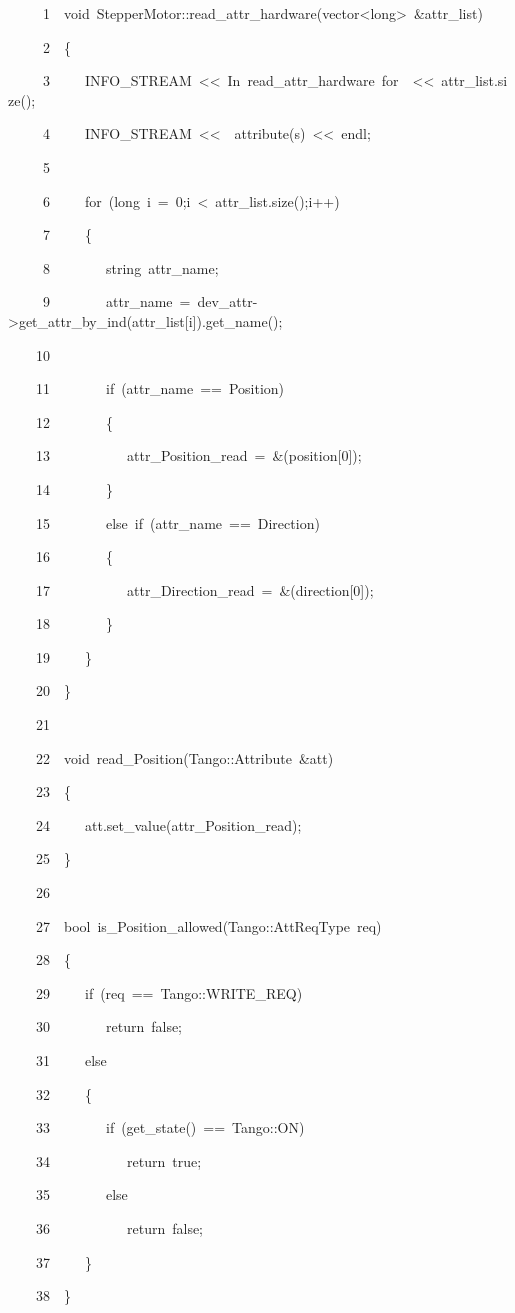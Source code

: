 
\begin{lyxcode}
~~~~~1~~void~StepperMotor::read\_attr\_hardware(vector<long>~\&attr\_list)

~~~~~2~~\{

~~~~~3~~~~~INFO\_STREAM~<\textcompwordmark{}<~\textquotedbl{}In~read\_attr\_hardware~for~\textquotedbl{}~<\textcompwordmark{}<~attr\_list.size();

~~~~~4~~~~~INFO\_STREAM~<\textcompwordmark{}<~\textquotedbl{}~attribute(s)\textquotedbl{}~<\textcompwordmark{}<~endl;

~~~~~5~~

~~~~~6~~~~~for~(long~i~=~0;i~<~attr\_list.size();i++)

~~~~~7~~~~~\{

~~~~~8~~~~~~~~string~attr\_name;

~~~~~9~~~~~~~~attr\_name~=~dev\_attr->get\_attr\_by\_ind(attr\_list{[}i{]}).get\_name();

~~~~10~~

~~~~11~~~~~~~~if~(attr\_name~==~\textquotedbl{}Position\textquotedbl{})

~~~~12~~~~~~~~\{

~~~~13~~~~~~~~~~~attr\_Position\_read~=~\&(position{[}0{]});

~~~~14~~~~~~~~\}

~~~~15~~~~~~~~else~if~(attr\_name~==~\textquotedbl{}Direction\textquotedbl{})

~~~~16~~~~~~~~\{

~~~~17~~~~~~~~~~~attr\_Direction\_read~=~\&(direction{[}0{]});

~~~~18~~~~~~~~\}

~~~~19~~~~~\}

~~~~20~~\}

~~~~21~~

~~~~22~~void~read\_Position(Tango::Attribute~\&att)

~~~~23~~\{

~~~~24~~~~~att.set\_value(attr\_Position\_read);

~~~~25~~\}

~~~~26~~

~~~~27~~bool~is\_Position\_allowed(Tango::AttReqType~req)

~~~~28~~\{

~~~~29~~~~~if~(req~==~Tango::WRITE\_REQ)

~~~~30~~~~~~~~return~false;

~~~~31~~~~~else

~~~~32~~~~~\{

~~~~33~~~~~~~~if~(get\_state()~==~Tango::ON)

~~~~34~~~~~~~~~~~return~true;

~~~~35~~~~~~~~else

~~~~36~~~~~~~~~~~return~false;

~~~~37~~~~~\}

~~~~38~~\}
\end{lyxcode}


